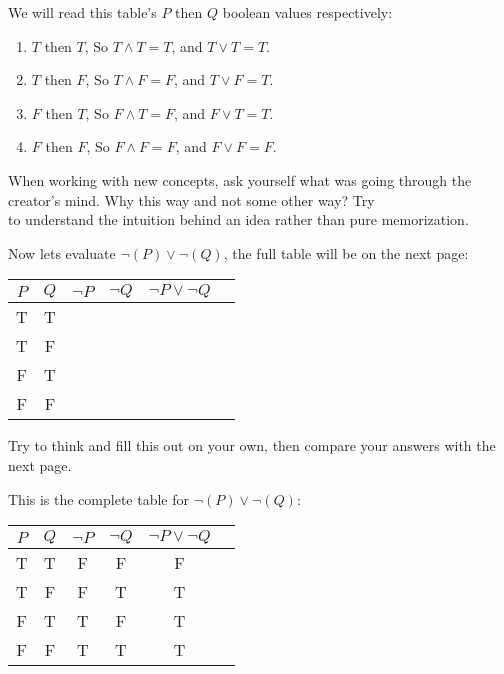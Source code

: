 \noindent
We will read this table's $P$ then $Q$ boolean values respectively:
\begin{enumerate}
    \item $T$ then $T$, So $T\land T = T$, and $T\lor T = T$.
    \item $T$ then $F$, So $T\land F = F$, and $T\lor F = T$.
    \item $F$ then $T$, So $F\land T = F$, and $F\lor T = T$.
    \item $F$ then $F$, So $F\land F = F$, and $F\lor F = F$.
\end{enumerate}

\begin{Tip}
    When working with new concepts, ask yourself what was going
    through the creator's mind. Why this way and not some other way? Try\\
    to understand the intuition behind an idea rather than pure memorization.\\
\end{Tip}

Now lets evaluate $\neg(P) \lor \neg(Q)$, the full table will be on the next page:\\

\begin{center}
    \begin{tabular}{|c|c|c|c|c|c|}
        \hline
        \rowcolor{OliveGreen!10}
        $P$ & $Q$ & $\neg P$ & $\neg Q$ & $\neg P \lor \neg Q$ \\
        \hline
        T   & T   &          &          &                      \\
        T   & F   &          &          &                      \\
        F   & T   &          &          &                      \\
        F   & F   &          &          &                      \\
        \hline
    \end{tabular}
\end{center}

\noindent
Try to think and fill this out on your own, then compare your answers with the next page.\\

\newpage

\noindent
This is the complete table for $\neg(P) \lor \neg(Q)$:
\begin{center}
    \begin{tabular}{|c|c|c|c|c|c|}
        \hline
        \rowcolor{OliveGreen!10}
        $P$ & $Q$ & $\neg P$ & $\neg Q$ & $\neg P \lor \neg Q$ \\
        \hline
        T   & T   & F        & F        & F                    \\
        T   & F   & F        & T        & T                    \\
        F   & T   & T        & F        & T                    \\
        F   & F   & T        & T        & T                    \\
        \hline
    \end{tabular}
\end{center}

